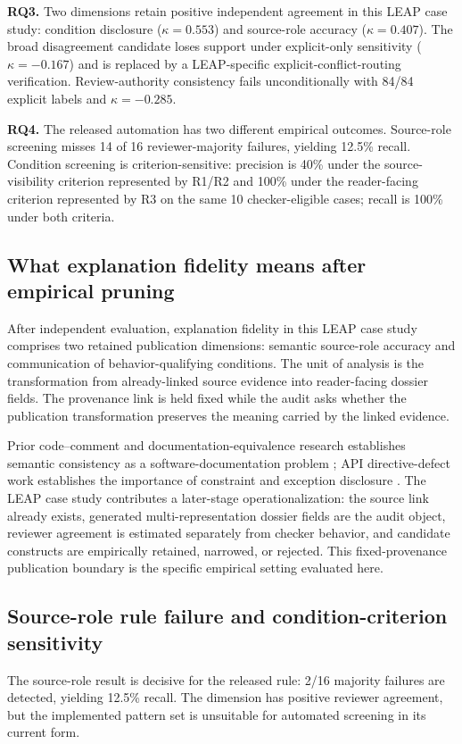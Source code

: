 \documentclass[a4paper,fleqn]{cas-dc}
\begin{document}
\textbf{RQ3.} Two dimensions retain positive independent agreement in this LEAP case study: condition disclosure ($\kappa=0.553$) and source-role accuracy ($\kappa=0.407$). The broad disagreement candidate loses support under explicit-only sensitivity ($\kappa=-0.167$) and is replaced by a LEAP-specific explicit-conflict-routing verification. Review-authority consistency fails unconditionally with 84/84 explicit labels and $\kappa=-0.285$.

\textbf{RQ4.} The released automation has two different empirical outcomes. Source-role screening misses 14 of 16 reviewer-majority failures, yielding 12.5\% recall. Condition screening is criterion-sensitive: precision is 40\% under the source-visibility criterion represented by R1/R2 and 100\% under the reader-facing criterion represented by R3 on the same 10 checker-eligible cases; recall is 100\% under both criteria.

\subsection{What explanation fidelity means after empirical pruning}
After independent evaluation, explanation fidelity in this LEAP case study comprises two retained publication dimensions: semantic source-role accuracy and communication of behavior-qualifying conditions. The unit of analysis is the transformation from already-linked source evidence into reader-facing dossier fields. The provenance link is held fixed while the audit asks whether the publication transformation preserves the meaning carried by the linked evidence.

Prior code--comment and documentation-equivalence research establishes semantic consistency as a software-documentation problem \citep{Wen2019,Xu2024,Eghbali2026}; API directive-defect work establishes the importance of constraint and exception disclosure \citep{Zhou2017}. The LEAP case study contributes a later-stage operationalization: the source link already exists, generated multi-representation dossier fields are the audit object, reviewer agreement is estimated separately from checker behavior, and candidate constructs are empirically retained, narrowed, or rejected. This fixed-provenance publication boundary is the specific empirical setting evaluated here.

\subsection{Source-role rule failure and condition-criterion sensitivity}
The source-role result is decisive for the released rule: 2/16 majority failures are detected, yielding 12.5\% recall. The dimension has positive reviewer agreement, but the implemented pattern set is unsuitable for automated screening in its current form.
\end{document}
